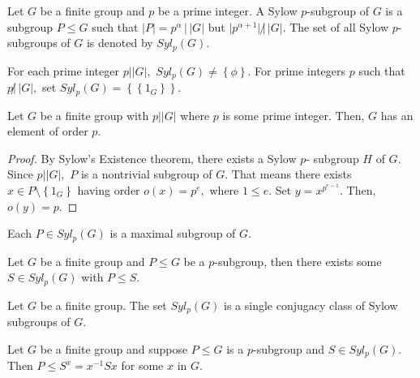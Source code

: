 \begin{definition}
	Let $G$ be a finite group and $p$ be a prime integer.
	A Sylow $p$\nobreakdash-subgroup of $G$ is a subgroup
	$P \leq G$ such that $ \lvert P \rvert = p^\alpha \, | \, \lvert G \rvert$
	but $ \lvert p^{\alpha +1}  \rvert \, \not | \, \lvert G \rvert .$
	The set of all Sylow $p$\nobreakdash-subgroups of $G$ is denoted 
	by $Syl_p(G).$
\end{definition}

For each prime integer $p | \lvert G \rvert,$ $Syl_p(G) \not = \left\{ \phi \right\} .$
For prime integers $p$ such that $p \not | \, \lvert G \rvert,$
set $Syl_p(G) = \left\{ \left\{ 1_G \right\}  \right\}.$

\begin{corollary}
	Let $G$ be a finite group with $p | \lvert G \rvert$ where $p$
	is some prime integer. Then, $G$ has an element of order $p.$
\end{corollary}

\begin{proof}
	By Sylow's Existence theorem, there exists a Sylow $p$\nobreakdash- subgroup
	$H$ of $G.$
	Since $p | \lvert G  \rvert,$
	$P$ is a nontrivial subgroup of $G.$
	That means there exists $x \in P \setminus \left\{ 1_G \right\}$
	having order $o(x) = p^e,$ where $1 \leq e.$
	Set $y = x^{p^{e-1}}.$ Then, $o(y) = p.$	
\end{proof}

Each $P \in Syl_p(G)$ is a maximal subgroup of $G.$

\begin{theorem}
	Let $G$ be a finite group and $P \leq G$ be a $p$\nobreakdash-subgroup,
	then there exists some $S \in Syl_p(G)$ with $P \leq S.$
\end{theorem}

\begin{theorem}
Let $G$ be a finite group. The set $Syl_p(G)$ is a single conjugacy class of Sylow
subgroups of $G.$
\end{theorem}

\begin{theorem}
	Let $G$ be a finite group and suppose $P \leq G$
	is a $p$\nobreakdash-subgroup and $S \in Syl_p(G).$
	Then $P \leq S^x = x^{-1}S x $ for some $x$ in $G.$
\end{theorem}

